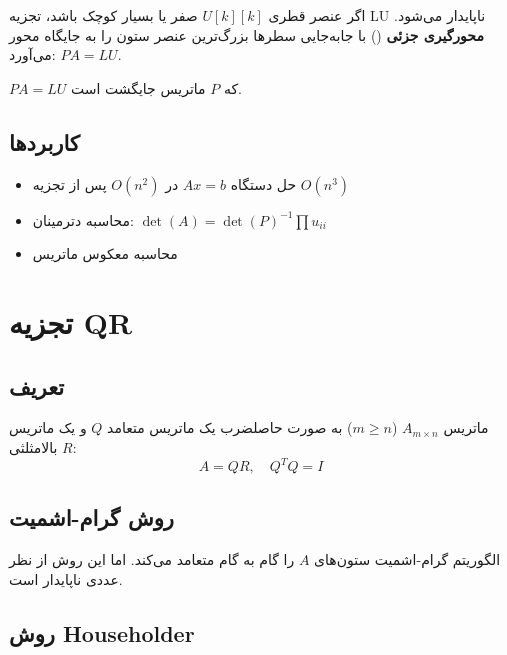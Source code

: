 \documentclass{matinbook}
\begin{document}
    اگر عنصر قطری $U[k][k]$ صفر یا بسیار کوچک باشد،
    تجزیه LU ناپایدار می‌شود.
    \textbf{محورگیری جزئی}
    () با جابه‌جایی سطرها
    بزرگ‌ترین عنصر ستون را به جایگاه محور می‌آورد:
    $PA = LU$.
    
    \begin{definition}
        $PA = LU$ که $P$ ماتریس جایگشت است.
        \label{def:lu-pivot}
    \end{definition}
    
    \subsection{کاربردها}
    
    \begin{itemize}
        \item حل دستگاه $Ax = b$ در $O(n^{2})$
        پس از تجزیه $O(n^{3})$
        \item محاسبه دترمینان:
        $\det(A) = \det(P)^{-1} \prod u_{ii}$
        \item محاسبه معکوس ماتریس
    \end{itemize}
    
    \section{تجزیه QR}
    
    \subsection{تعریف}
    
    \begin{definition}[تجزیه QR]
        ماتریس $A_{m \times n}$ ($m \geq n$)
        به صورت حاصلضرب یک ماتریس متعامد $Q$
        و یک ماتریس بالامثلثی $R$:
        \[
        A = QR, \quad Q^{T}Q = I
        \]
        \label{def:qr-decomposition}
    \end{definition}
    
    \subsection{روش گرام-اشمیت}
    
    الگوریتم گرام-اشمیت
    ستون‌های $A$ را گام به گام
    متعامد می‌کند.
    اما این روش از نظر عددی ناپایدار است.
    
    \subsection{روش Householder}
    
\end{document}
